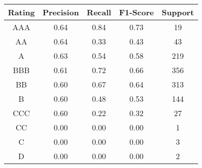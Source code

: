 \footnotesize
\begin{tabular}{ccccc}
\toprule
Rating & Precision & Recall & F1-Score & Support \\
\midrule
AAA & 0.64 & 0.84 & 0.73 & 19 \\
AA & 0.64 & 0.33 & 0.43 & 43 \\
A & 0.63 & 0.54 & 0.58 & 219 \\
BBB & 0.61 & 0.72 & 0.66 & 356 \\
BB & 0.60 & 0.67 & 0.64 & 313 \\
B & 0.60 & 0.48 & 0.53 & 144 \\
CCC & 0.60 & 0.22 & 0.32 & 27 \\
CC & 0.00 & 0.00 & 0.00 & 1 \\
C & 0.00 & 0.00 & 0.00 & 3 \\
D & 0.00 & 0.00 & 0.00 & 2 \\
\bottomrule
\end{tabular}

\normalsize